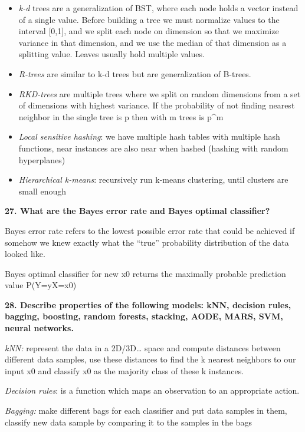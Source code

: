 \begin{itemize}
\item \textit{k-d} trees are a generalization of BST, where each node
  holds a vector instead of a single value. Before building a tree we
  must normalize values to the interval {[}0,1{]}, and we split each
  node on dimension so that we maximize variance in that dimension, and
  we use the median of that dimension as a splitting value. Leaves
  usually hold multiple values.
\item \textit{R-trees} are similar to k-d trees but are generalization of
  B-trees.
\item \textit{RKD-trees} are multiple trees where we split on random
  dimensions from a set of dimensions with highest variance. If the
  probability of not finding nearest neighbor in the single tree is p
  then with m trees is p\^{}m
\item \textit{Local sensitive hashing}: we have multiple hash tables with
  multiple hash functions, near instances are also near when hashed
  (hashing with random hyperplanes)
\item \textit{Hierarchical k-means}: recursively run k-means clustering,
  until clusters are small enough
\end{itemize}

\textbf{27. What are the Bayes error rate and Bayes optimal classifier?}

Bayes error rate refers to the lowest possible error rate that could be
achieved if somehow we knew exactly what the ``true'' probability
distribution of the data looked like.

Bayes optimal classifier for new x0 returns the maximally probable
prediction value P(Y=y\textbar X=x0)

\textbf{28. Describe properties of the following models: kNN, decision
rules, bagging, boosting, random forests, stacking, AODE, MARS, SVM,
neural networks.}

\textit{kNN:} represent the data in a 2D/3D\ldots{} space and compute
distances between different data samples, use these distances to find
the k nearest neighbors to our input x0 and classify x0 as the majority
class of these k instances.

\textit{Decision rules}: is a function which maps an observation to
an appropriate action.

\textit{Bagging:} make different bags for each classifier and put
data samples in them, classify new data sample by comparing it to the
samples in the bags

